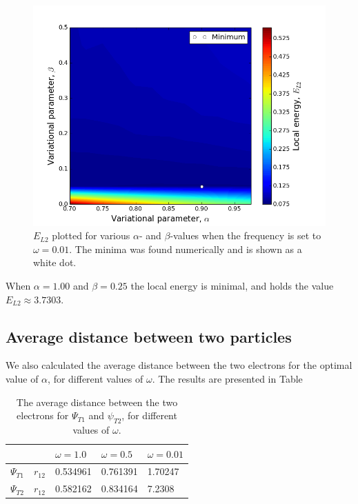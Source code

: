 \documentclass[norsk,a4paper,12pt]{article}
\begin{document}
\begin{figure} [H]
    \centering
    \includegraphics[width=12cm]{E_L2_contour_omega=0_01.png}
    \caption{$E_{L2}$ plotted for various $\alpha$- and $\beta$-values when the frequency is set to $\omega=0.01$. The minima was found numerically and is shown as a white dot.}
    \label{fig:E_L2_omega=0_01}
\end{figure}
When $\alpha=1.00$ and $\beta=0.25$ the local energy is minimal, and holds the value $E_{L2}\approx3.7303$.



\subsection{Average distance between two particles}
We also calculated the average distance between the two electrons for the optimal value of $\alpha$, for different values of $\omega$. The results are presented in Table 

\begin{table} [H]
\centering
\caption{The average distance between the two electrons for $\Psi_{T1}$ and $\psi_{T2}$, for different values of $\omega$.}

\begin{tabularx}{\textwidth}{XXXX} \hline
\label{tab:average_r12}
{\bf } & {\bf $\omega = 1.0$ } & {\bf $ \omega = 0.5 $ } & {\bf $\omega = 0.01$} \\ \hline
{$\Psi_{T1} \quad r_{12}$} & 0.534961 & 0.761391 & 1.70247\\ \hline 
{$\Psi_{T2} \quad r_{12}$} & 0.582162 & 0.834164 & 7.2308\\ \hline 
\end{tabularx}
\end{table}
\end{document}
